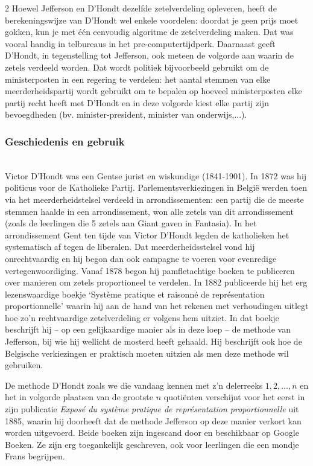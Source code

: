 \begin{multicols}{2}
Hoewel Jefferson en D'Hondt dezelfde zetelverdeling opleveren, heeft de berekeningswijze van D'Hondt wel enkele voordelen: doordat je geen prijs moet gokken, kun je met één eenvoudig algoritme de zetelverdeling maken. Dat was vooral handig in telbureaus in het pre-computertijdperk. Daarnaast geeft D'Hondt, in tegenstelling tot Jefferson, ook meteen de volgorde aan waarin de zetels verdeeld worden. Dat wordt politiek bijvoorbeeld  gebruikt om de ministerposten in een regering te verdelen: het aantal stemmen van elke meerderheidspartij wordt gebruikt om te bepalen op hoeveel ministerposten elke partij recht heeft met D'Hondt en in deze volgorde kiest elke partij zijn bevoegdheden (bv. minister-president, minister van onderwijs,...). 

\subsubsection{Geschiedenis en gebruik}
$\;$\\
Victor D'Hondt was een Gentse jurist en wiskundige (1841-1901). In 1872 was hij politicus voor de Katholieke Partij. 
Parlementsverkiezingen in België werden toen via het meerderheidstelsel verdeeld in arrondissementen: een partij die de meeste stemmen haalde in een arrondissement, won alle zetels van dit arrondissement (zoals de leerlingen die 5 zetels aan Giant gaven in Fantasia). In het arrondissement Gent ten tijde van Victor D'Hondt legden de katholieken het systematisch af tegen de liberalen. Dat meerderheidsstelsel vond hij onrechtvaardig en hij begon dan ook campagne te voeren voor evenredige vertegenwoordiging. Vanaf 1878 begon hij pamfletachtige boeken te publiceren over manieren om zetels proportioneel te verdelen. In 1882 publiceerde hij het erg lezenswaardige boekje `Système pratique et raisonné de représentation proportionnelle' waarin hij aan de hand van het rekenen met verhoudingen uitlegt hoe zo'n rechtvaardige zetelverdeling er volgens hem uitziet. In dat boekje beschrijft hij -- op een gelijkaardige manier als in deze loep -- de methode van Jefferson, bij wie hij wellicht de mosterd heeft gehaald. Hij beschrijft ook hoe de Belgische verkiezingen er praktisch moeten uitzien als men deze methode wil gebruiken. 

De methode D'Hondt zoals we die vandaag kennen met z'n delerreeks $1,2,\ldots,n$ en het in volgorde plaatsen van de grootste $n$ quotiënten verschijnt voor het eerst in zijn publicatie \textit{Exposé du système pratique de représentation proportionnelle} uit 1885, waarin hij doorheeft dat de methode Jefferson op deze manier verkort kan worden uitgevoerd. Beide boeken zijn ingescand door en beschikbaar op Google Boeken. Ze zijn erg toegankelijk geschreven, ook voor leerlingen die een mondje Frans begrijpen. 


\end{multicols}
